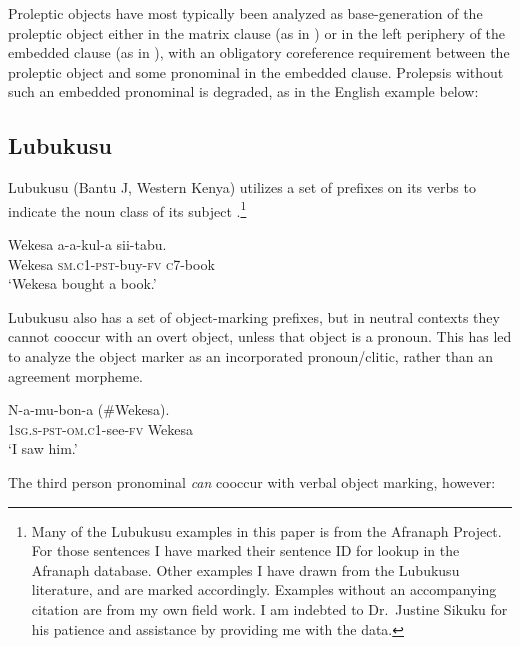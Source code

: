 \documentclass[output=paper,colorlinks,citecolor=brown]{langscibook}
\begin{document}
Proleptic objects have most typically been analyzed as base-generation of the proleptic object either in the matrix clause (as in \citealt{Salzmann2017Chapter}) or in the left periphery of the embedded clause (as in \citealt{VanKoppenEtAl2016}), with an obligatory coreference requirement between the proleptic object and some pronominal in the embedded clause. Prolepsis without such an embedded pronominal is degraded, as in the English example below:

\z

\subsection{Lubukusu}\label{sec:newkirk:1.2}

Lubukusu (Bantu J, Western Kenya) utilizes a set of prefixes on its verbs to indicate the noun class of its subject .\footnote{Many of the Lubukusu examples in this paper is from the Afranaph Project. For those sentences I have marked their sentence ID for lookup in the Afranaph database. Other examples I have drawn from the Lubukusu literature, and are marked accordingly. Examples without an accompanying citation are from my own field work. I am indebted to Dr.\ Justine Sikuku for his patience and assistance by providing me with the data. \nocite{SafirSikuku2011}}

\ea%
    \label{ex:newkirk:4}
    \gll    Wekesa \alert{a}-a-kul-a sii-tabu.\\
			Wekesa \textsc{sm.c1-pst-}buy\textsc{-fv} \textsc{c7-}book\\
	\glt    `Wekesa bought a book.'\hfill \citep[ex. 11a]{Wasike2006}
\z

Lubukusu also has a set of object-marking prefixes, but in neutral contexts they cannot cooccur with an overt object, unless that object is a pronoun. This has led \citet{DiercksSikuku2015, SikukuEtAl2018} to analyze the object marker as an incorporated pronoun/clitic, rather than an agreement morpheme.

\ea%
    \label{ex:newkirk:5}
    \gll    N-a-\alert{mu}-bon-a (\#Wekesa).\\
			\textsc{1sg.s-pst-om.c1-}see\textsc{-fv} Wekesa\\
	\glt    `I saw him.' \hfill \citep[ex. 2]{DiercksSikuku2015}
\z

The third person pronominal  \emph{can} cooccur with verbal object marking, however:
\end{document}
